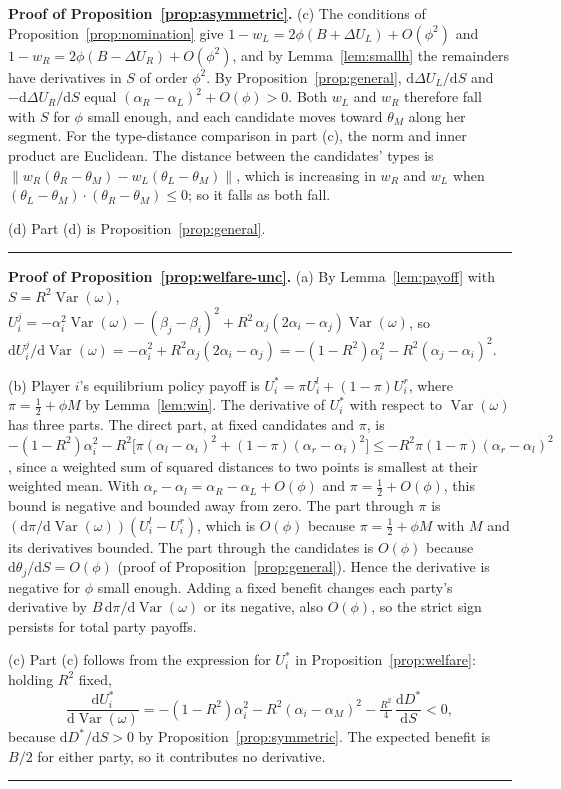 \documentclass[12pt,letterpaper]{article}
\newenvironment{proof}[1][Proof]{\noindent\textbf{#1.} }{\ \rule{0.5em}{0.5em}}
\begin{document}
\begin{proof}[Proof of Proposition~\ref{prop:asymmetric}]
(c) The conditions of Proposition~\ref{prop:nomination} give $1-w_L=2\phi(B+\Delta U_L)+O(\phi^2)$ and $1-w_R=2\phi(B-\Delta U_R)+O(\phi^2)$, and by Lemma~\ref{lem:smallh} the remainders have derivatives in $S$ of order $\phi^2$. By Proposition~\ref{prop:general}, $\mathrm{d}\Delta U_L/\mathrm{d}S$ and $-\mathrm{d}\Delta U_R/\mathrm{d}S$ equal $(\alpha_R-\alpha_L)^2+O(\phi)>0$. Both $w_L$ and $w_R$ therefore fall with $S$ for $\phi$ small enough, and each candidate moves toward $\theta_M$ along her segment. For the type-distance comparison in part (c), the norm and inner product are Euclidean. The distance between the candidates' types is $\|w_R(\theta_R-\theta_M)-w_L(\theta_L-\theta_M)\|$, which is increasing in $w_R$ and $w_L$ when $(\theta_L-\theta_M)\cdot(\theta_R-\theta_M)\le0$; so it falls as both fall.

(d) Part (d) is Proposition~\ref{prop:general}.
\end{proof}

\begin{proof}[Proof of Proposition~\ref{prop:welfare-unc}]
(a) By Lemma~\ref{lem:payoff} with $S=R^2\operatorname{Var}(\omega)$, $U_i^j=-\alpha_i^2\operatorname{Var}(\omega)-(\beta_j-\beta_i)^2+R^2\,\alpha_j(2\alpha_i-\alpha_j)\operatorname{Var}(\omega)$, so $\mathrm{d}U_i^j/\mathrm{d}\operatorname{Var}(\omega)=-\alpha_i^2+R^2\alpha_j(2\alpha_i-\alpha_j)=-(1-R^2)\alpha_i^2-R^2(\alpha_j-\alpha_i)^2$.

(b) Player $i$'s equilibrium policy payoff is $U_i^*=\pi U_i^l+(1-\pi)U_i^r$, where $\pi=\tfrac12+\phi M$ by Lemma~\ref{lem:win}. The derivative of $U_i^*$ with respect to $\operatorname{Var}(\omega)$ has three parts. The direct part, at fixed candidates and $\pi$, is $-(1-R^2)\alpha_i^2-R^2\big[\pi(\alpha_l-\alpha_i)^2+(1-\pi)(\alpha_r-\alpha_i)^2\big]\le-R^2 \pi(1-\pi)(\alpha_r-\alpha_l)^2$, since a weighted sum of squared distances to two points is smallest at their weighted mean. With $\alpha_r-\alpha_l=\alpha_R-\alpha_L+O(\phi)$ and $\pi=\tfrac12+O(\phi)$, this bound is negative and bounded away from zero. The part through $\pi$ is $(\mathrm{d}\pi/\mathrm{d}\operatorname{Var}(\omega))(U_i^l-U_i^r)$, which is $O(\phi)$ because $\pi=\tfrac12+\phi M$ with $M$ and its derivatives bounded. The part through the candidates is $O(\phi)$ because $\mathrm{d}\theta_j/\mathrm{d}S=O(\phi)$ (proof of Proposition~\ref{prop:general}). Hence the derivative is negative for $\phi$ small enough. Adding a fixed benefit changes each party's derivative by $B\,\mathrm{d}\pi/\mathrm{d}\operatorname{Var}(\omega)$ or its negative, also $O(\phi)$, so the strict sign persists for total party payoffs.

(c) Part (c) follows from the expression for $U_i^*$ in Proposition~\ref{prop:welfare}: holding $R^2$ fixed,
\[
\frac{\mathrm{d}U_i^*}{\mathrm{d}\operatorname{Var}(\omega)}=-(1-R^2)\alpha_i^2-R^2(\alpha_i-\alpha_M)^2-\tfrac{R^2}{4}\,\frac{\mathrm{d}D^*}{\mathrm{d}S}<0,
\]
because $\mathrm{d}D^*/\mathrm{d}S>0$ by Proposition~\ref{prop:symmetric}. The expected benefit is $B/2$ for either party, so it contributes no derivative.
\end{proof}
\end{document}
